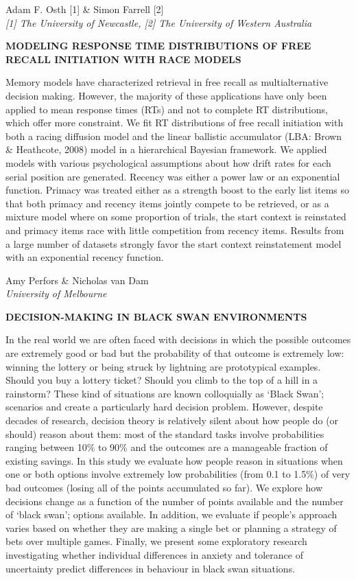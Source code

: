 \documentclass[]{article}
\begin{document}
Adam F. Osth {[}1{]} \& Simon Farrell {[}2{]}\\
\emph{{[}1{]} The University of Newcastle, {[}2{]} The University of
Western Australia}

\textbf{MODELING RESPONSE TIME DISTRIBUTIONS OF FREE RECALL INITIATION
WITH RACE MODELS}

Memory models have characterized retrieval in free recall as
multialternative decision making. However, the majority of these
applications have only been applied to mean response times (RTs) and not
to complete RT distributions, which offer more constraint. We fit RT
distributions of free recall initiation with both a racing diffusion
model and the linear ballistic accumulator (LBA: Brown \& Heathcote,
2008) model in a hierarchical Bayesian framework. We applied models with
various psychological assumptions about how drift rates for each serial
position are generated. Recency was either a power law or an exponential
function. Primacy was treated either as a strength boost to the early
list items so that both primacy and recency items jointly compete to be
retrieved, or as a mixture model where on some proportion of trials, the
start context is reinstated and primacy items race with little
competition from recency items. Results from a large number of datasets
strongly favor the start context reinstatement model with an exponential
recency function.\\
\pagebreak  

Amy Perfors \& Nicholas van Dam\\
\emph{University of Melbourne}

\textbf{DECISION-MAKING IN BLACK SWAN ENVIRONMENTS}

In the real world we are often faced with decisions in which the
possible outcomes are extremely good or bad but the probability of that
outcome is extremely low: winning the lottery or being struck by
lightning are prototypical examples. Should you buy a lottery ticket?
Should you climb to the top of a hill in a rainstorm? These kind of
situations are known colloquially as `Black Swan'; scenarios and create
a particularly hard decision problem. However, despite decades of
research, decision theory is relatively silent about how people do (or
should) reason about them: most of the standard tasks involve
probabilities ranging between 10\% to 90\% and the outcomes are a
manageable fraction of existing savings. In this study we evaluate how
people reason in situations when one or both options involve extremely
low probabilities (from 0.1 to 1.5\%) of very bad outcomes (losing all
of the points accumulated so far). We explore how decisions change as a
function of the number of points available and the number of `black
swan'; options available. In addition, we evaluate if people's approach
varies based on whether they are making a single bet or planning a
strategy of bets over multiple games. Finally, we present some
exploratory research investigating whether individual differences in
anxiety and tolerance of uncertainty predict differences in behaviour in
black swan situations.\\
\pagebreak  
\end{document}
